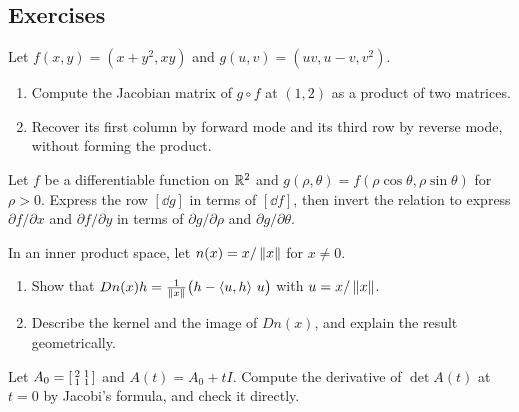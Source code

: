 \begin{notechapter}
\section*{Exercises}

\begin{exercise}\label{chain-rule-autodiff:exr:1}
Let $f(x, y) = (x + y^2, xy)$ and $g(u, v) = (uv, u - v, v^2)$.
\begin{enumerate}[nosep]
  \item Compute the Jacobian matrix of $g\circ f$ at $(1, 2)$ as a product
        of two matrices.
  \item Recover its first column by forward mode and its third row by
        reverse mode, without forming the product.
\end{enumerate}
\end{exercise}

\begin{exercise}\label{chain-rule-autodiff:exr:2}
Let $f$ be a differentiable function on $\mathbb{R}^2$ and
$g(\rho, \theta) = f(\rho\cos\theta, \rho\sin\theta)$ for $\rho > 0$.
Express the row $[\dd g]$ in terms of $[\dd f]$, then invert the relation
to express $\partial f/\partial x$ and $\partial f/\partial y$ in terms of
$\partial g/\partial\rho$ and $\partial g/\partial\theta$.
\end{exercise}

\begin{exercise}\label{chain-rule-autodiff:exr:3}
In an inner product space, let $n(x) = x/\left\|x\right\|$ for $x\neq0$.
\begin{enumerate}[nosep]
  \item Show that $Dn(x)h = \frac1{\left\|x\right\|}\bigl(h - \left\langle u, h \right\rangle\,u\bigr)$
        with $u = x/\left\|x\right\|$.
  \item Describe the kernel and the image of $Dn(x)$, and explain the
        result geometrically.
\end{enumerate}
\end{exercise}

\begin{exercise}\label{chain-rule-autodiff:exr:4}
Let $A_0 = \begin{bsmallmatrix}2 & 1\\1 & 1\end{bsmallmatrix}$ and
$A(t) = A_0 + tI$. Compute the derivative of $\det A(t)$ at $t = 0$ by
Jacobi's formula, and check it directly.
\end{exercise}


\end{notechapter}

